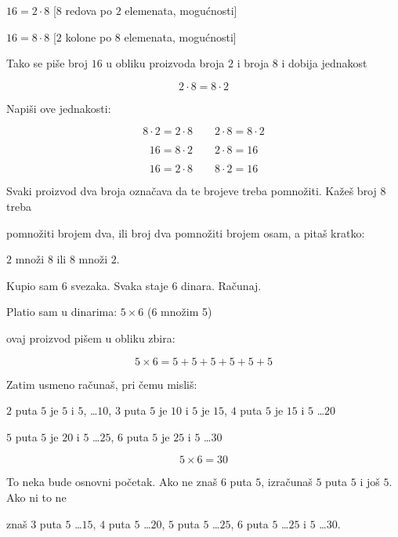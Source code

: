\begin{zad}
\begin{enumerate}
            $16 = 2 \cdot 8$ [$8$ redova po $2$ elemenata, mogu\' cnosti]

            $16 = 8 \cdot 8$ [$2$ kolone po $8$ elemenata, mogu\' cnosti]



            Tako se pi\v se broj $16$ u obliku proizvoda broja $2$ i broja $8$ i dobija jednakost

            $$2 \cdot 8 = 8 \cdot 2$$

            Napi\v si ove jednakosti:

            $$8 \cdot 2 = 2 \cdot 8 \qquad 2 \cdot 8 = 8 \cdot 2$$

            $$16 = 8 \cdot 2 \qquad 2 \cdot 8 = 16$$

            $$16 = 2 \cdot 8 \qquad 8 \cdot 2 = 16$$



            Svaki proizvod dva broja ozna\v cava da te brojeve treba pomno\v ziti. Ka\v ze\v s broj $8$ treba 

            pomno\v ziti brojem dva, ili broj dva pomno\v ziti brojem osam, a pita\v s kratko:

            $2$ mno\v zi $8$ ili $8$ mno\v zi $2$.

        \end{enumerate}

    \end{zad}

    \begin{zad}

        Kupio sam $6$ svezaka. Svaka staje $6$ dinara. Ra\v cunaj.



        Platio sam u dinarima: $5 \times 6$ (6 mno\v zim 5)

        ovaj proizvod pi\v sem u obliku zbira:

        $$5 \times 6 = 5 + 5 + 5 + 5 + 5 + 5$$



        Zatim usmeno ra\v cuna\v s, pri \v cemu misli\v s:



        $2$ puta $5$ je $5$ i $5$, \dots $10$, $3$ puta $5$ je $10$ i $5$ je $15$, $4$ puta $5$ je $15$ i $5$ \dots $20$

        $5$ puta $5$ je $20$ i $5$ \dots $25$, $6$ puta $5$ je $25$ i $5$ \dots $30$

        $$5 \times 6 = 30$$



        To neka bude osnovni po\v cetak. Ako ne zna\v s $6$ puta $5$, izra\v cuna\v s $5$ puta $5$ i jo\v s $5$. Ako ni to ne

        zna\v s $3$ puta $5$ \dots $15$, $4$ puta $5$ \dots $20$, $5$ puta $5$ \dots $25$, $6$ puta $5$ \dots $25$ i $5$ \dots $30$.

    \end{zad}

